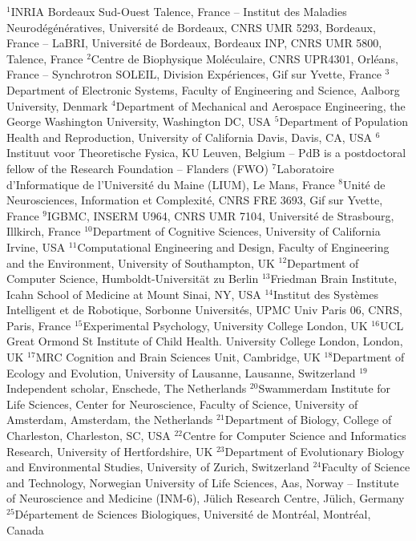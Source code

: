 $^{1}$INRIA Bordeaux Sud-Ouest Talence, France – Institut des Maladies Neurodégénératives, Université de Bordeaux, CNRS UMR 5293, Bordeaux, France – LaBRI, Université de Bordeaux, Bordeaux INP, CNRS UMR 5800, Talence, France
$^{2}$Centre de Biophysique Moléculaire, CNRS UPR4301, Orléans, France -- Synchrotron SOLEIL, Division Expériences, Gif sur Yvette, France
$^{3}$Department of Electronic Systems, Faculty of Engineering and Science, Aalborg University, Denmark
$^{4}$Department of Mechanical and Aerospace Engineering, the George Washington University, Washington DC, USA
$^{5}$Department of Population Health and Reproduction, University of California Davis, Davis, CA, USA
$^{6}$Instituut voor Theoretische Fysica, KU Leuven, Belgium -- PdB is a postdoctoral fellow of the Research Foundation -- Flanders (FWO)
$^{7}$Laboratoire d'Informatique de l'Université du Maine (LIUM), Le Mans, France
$^{8}$Unité de Neurosciences, Information et Complexité, CNRS FRE 3693, Gif sur Yvette, France
$^{9}$IGBMC, INSERM U964, CNRS UMR 7104, Université de Strasbourg, Illkirch, France
$^{10}$Department of Cognitive Sciences, University of California Irvine, USA
$^{11}$Computational Engineering and Design, Faculty of Engineering and the Environment, University of Southampton, UK
$^{12}$Department of Computer Science, Humboldt-Universität zu Berlin
$^{13}$Friedman Brain Institute, Icahn School of Medicine at Mount Sinai, NY, USA
$^{14}$Institut des Systèmes Intelligent et de Robotique, Sorbonne Universités, UPMC Univ Paris 06, CNRS, Paris, France
$^{15}$Experimental Psychology, University College London, UK
$^{16}$UCL Great Ormond St Institute of Child Health. University College London, London, UK
$^{17}$MRC Cognition and Brain Sciences Unit, Cambridge, UK
$^{18}$Department of Ecology and Evolution, University of Lausanne, Lausanne, Switzerland
$^{19}$Independent scholar, Enschede, The Netherlands
$^{20}$Swammerdam Institute for Life Sciences, Center for Neuroscience, Faculty of Science, University of Amsterdam, Amsterdam, the Netherlands
$^{21}$Department of Biology, College of Charleston, Charleston, SC, USA
$^{22}$Centre for Computer Science and Informatics Research, University of Hertfordshire, UK
$^{23}$Department of Evolutionary Biology and Environmental Studies, University of Zurich, Switzerland
$^{24}$Faculty of Science and Technology, Norwegian University of Life Sciences, Aas, Norway -- Institute of Neuroscience and Medicine (INM-6), Jülich Research Centre, Jülich, Germany
$^{25}$Département de Sciences Biologiques, Université de Montréal, Montréal, Canada

